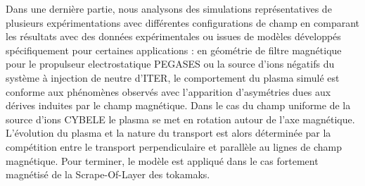 		Dans une dernière partie, nous analysons des simulations représentatives de
		plusieurs expérimentations avec différentes configurations de champ en comparant
		les résultats avec des données expérimentales ou issues de modèles développés
		spécifiquement pour certaines applications :
		en géométrie de filtre magnétique pour le propulseur electrostatique PEGASES ou
		la source d'ions négatifs du système à injection de neutre d'ITER, le
		comportement du plasma simulé est conforme aux phénomènes observés avec
		l’apparition d’asymétries dues aux dérives induites par le champ magnétique.
		Dans le cas du champ uniforme de la source d'ions CYBELE le plasma se met en
		rotation autour de l'axe magnétique. L'évolution du plasma et la nature du
		transport est alors déterminée par la compétition entre le transport
		perpendiculaire et parallèle au lignes de champ magnétique. Pour terminer, le
		modèle est appliqué dans le cas fortement magnétisé de la Scrape-Of-Layer des
		tokamaks.
